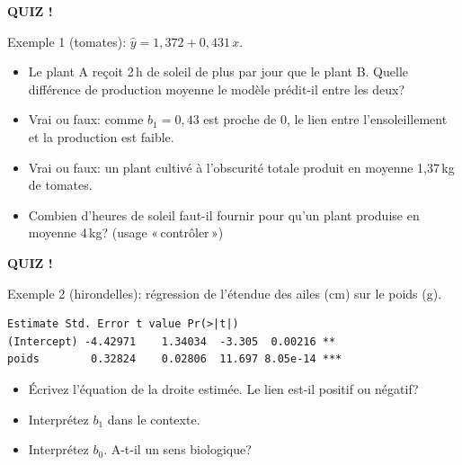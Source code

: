 \documentclass{BeamerTemplate}
\begin{document}
\begin{frame}[plain,t]
  \centerline{\LARGE\bfseries\alert{QUIZ !}}

  \medskip
  Exemple 1 (tomates): $\hat y=1{,}372+0{,}431\,x$.
  \begin{itemize}\itemsep 7mm
    \item Le plant A reçoit 2\,h de soleil de plus par jour que le plant B. Quelle
    différence de production moyenne le modèle prédit-il entre les deux?
    \item<2-> Vrai ou faux: comme $b_1=0{,}43$ est proche de 0, le lien entre
    l'ensoleillement et la production est faible.
    \item<3-> Vrai ou faux: un plant cultivé à l'obscurité totale produit en
    moyenne 1,37\,kg de tomates.
    \item<4-> Combien d'heures de soleil faut-il fournir pour qu'un plant produise
    en moyenne 4\,kg? (usage «\,contrôler\,»)
  \end{itemize}
\end{frame}

\begin{frame}
  \centerline{\LARGE\bfseries\alert{QUIZ !}}

  \medskip
  Exemple 2 (hirondelles): régression de l'étendue des ailes (cm) sur le poids (g).
\begin{Verbatim}[fontsize=\scriptsize]
            Estimate Std. Error t value Pr(>|t|)
(Intercept) -4.42971    1.34034  -3.305  0.00216 **
poids        0.32824    0.02806  11.697 8.05e-14 ***
\end{Verbatim}
  \begin{itemize}\itemsep 1cm
    \item Écrivez l'équation de la droite estimée. Le lien est-il positif ou négatif?
    \item<2-> Interprétez $b_1$ dans le contexte.
    \item<3-> Interprétez $b_0$. A-t-il un sens biologique?
  \end{itemize}
\end{frame}
\end{document}
